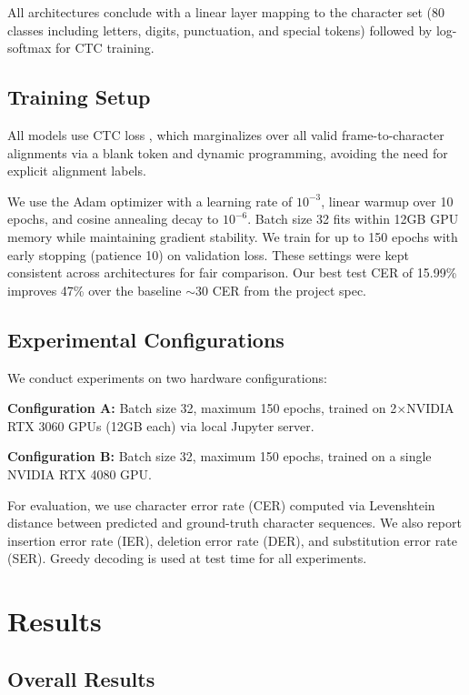 \documentclass{article}
\begin{document}
All architectures conclude with a linear layer mapping to the character set (80 classes including letters, digits, punctuation, and special tokens) followed by log-softmax for CTC training.

\subsection{Training Setup}

All models use CTC loss \citep{graves2006connectionist}, which marginalizes over all valid frame-to-character alignments via a blank token and dynamic programming, avoiding the need for explicit alignment labels.

We use the Adam optimizer with a learning rate of $10^{-3}$, linear warmup over 10 epochs, and cosine annealing decay to $10^{-6}$. Batch size 32 fits within 12GB GPU memory while maintaining gradient stability. We train for up to 150 epochs with early stopping (patience 10) on validation loss. These settings were kept consistent across architectures for fair comparison. Our best test CER of 15.99\% improves 47\% over the baseline $\sim$30 CER from the project spec.

\subsection{Experimental Configurations}

We conduct experiments on two hardware configurations:

\textbf{Configuration A:} Batch size 32, maximum 150 epochs, trained on 2$\times$NVIDIA RTX 3060 GPUs (12GB each) via local Jupyter server.

\textbf{Configuration B:} Batch size 32, maximum 150 epochs, trained on a single NVIDIA RTX 4080 GPU.

For evaluation, we use character error rate (CER) computed via Levenshtein distance between predicted and ground-truth character sequences. We also report insertion error rate (IER), deletion error rate (DER), and substitution error rate (SER). Greedy decoding is used at test time for all experiments.

\section{Results}

\subsection{Overall Results}
\end{document}
